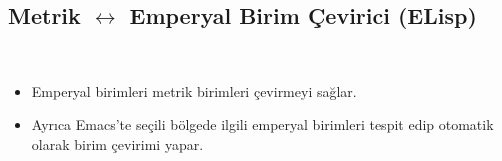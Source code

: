 \documentclass[a4paper, 9pt]{extarticle}
\begin{document}

\subsection{Metrik $\longleftrightarrow$ Emperyal Birim Çevirici (ELisp)}
\hfill \\
\begin{itemize}
\item Emperyal birimleri metrik birimleri çevirmeyi sağlar.
\item Ayrıca Emacs'te seçili bölgede ilgili emperyal birimleri tespit edip
	otomatik olarak birim çevirimi yapar.
\end{itemize}

\mydiller{}
\myteknikbecerilerb{}
\myhobilerb{}

\end{document}
